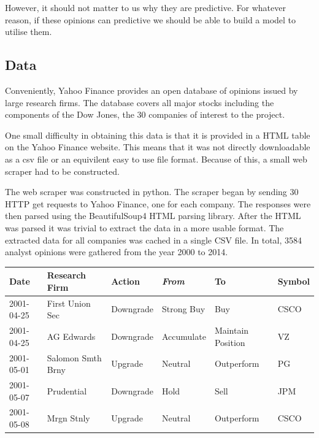\documentclass{report}
\begin{document}
However, it should not matter to us why they are predictive. For whatever reason, if these opinions can predictive we should be able to build a model to utilise them.

\subsection{Data}

Conveniently, Yahoo Finance provides an open database of opinions issued by large research firms. The database covers all major stocks including the components of the Dow Jones, the 30 companies of interest to the project. 

One small difficulty in obtaining this data is that it is provided in a HTML table on the Yahoo Finance website. This means that it was not directly downloadable as a csv file or an equivilent easy to use file format. Because of this, a small web scraper had to be constructed. 

The web scraper was constructed in python. The scraper began by sending 30 HTTP get requests to Yahoo Finance, one for each company. The responses were then parsed using the BeautifulSoup4 HTML parsing library. After the HTML was parsed it was trivial to extract the data in a more usable format. The extracted data for all companies was cached in a single CSV file. In total, 3584 analyst opinions were gathered from the year 2000 to 2014.

\begin{center}
  
  \begin{tabular}{l | l | l | l | l | l}
\textbf{Date}        & \textbf{Research Firm}      & \textbf{Action}       & \textit{From}         & \textbf{To}                   & \textbf{Symbol} \\ \hline
2001-04-25  & First Union Sec    & Downgrade    & Strong Buy   & Buy                  & CSCO \\ \hline
2001-04-25  & AG Edwards         & Downgrade    & Accumulate   & Maintain Position    & VZ \\ \hline
2001-05-01  & Salomon Smth Brny  & Upgrade      & Neutral      & Outperform           & PG \\ \hline
2001-05-07  & Prudential         & Downgrade    & Hold         & Sell                 & JPM \\ \hline
2001-05-08  & Mrgn Stnly         & Upgrade      & Neutral      & Outperform           & CSCO
	  \label{table:opinions-data}
  \end{tabular}
\end{center}
\end{document}

